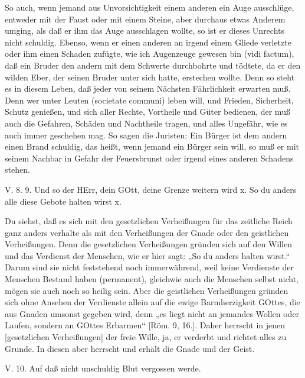 So auch, wenn jemand aus Unvorsichtigkeit einem anderen ein Auge ausschlüge, entweder mit der Faust oder mit einem Steine, aber durchaus etwas Anderem umging, als daß er ihm das Auge ausschlagen wollte, so ist er dieses Unrechts nicht schuldig. Ebenso, wenn er einen anderen an irgend einem Gliede verletzte oder ihm einen Schaden zufügte, wie ich Augenzeuge gewesen bin (vidi factum), daß ein Bruder den andern mit dem Schwerte durchbohrte und tödtete, da er den wilden Eber, der seinen Bruder unter sich hatte, erstechen wollte. Denn so steht es in diesem Leben, daß jeder von seinem Nächsten Fährlichkeit erwarten muß. Denn wer unter Leuten (societate communi) leben will, und Frieden, Sicherheit, Schutz genießen, und sich aller Rechte, Vortheile und Güter bedienen, der muß auch die Gefahren, Schäden und Nachtheile tragen, und alles Ungefähr, wie es auch immer geschehen mag. So sagen die Juristen: Ein Bürger ist dem andern einen Brand schuldig, das heißt, wenn jemand ein Bürger sein will, so muß er mit seinem Nachbar in Gefahr der Feuersbrunst oder irgend eines anderen Schadens stehen.

\begin{schriftzitat}
V. 8. 9. Und so der HErr, dein GOtt, deine Grenze weitern wird x. So du anders alle diese Gebote halten wirst x.
\end{schriftzitat}

Du siehst, daß es sich mit den gesetzlichen Verheißungen für das zeitliche Reich ganz anders verhalte als mit den Verheißungen der Gnade oder den geistlichen Verheißungen. Denn die gesetzlichen Verheißungen gründen sich auf den Willen und das Verdienst der Menschen, wie er hier sagt: „So du anders halten wirst.“ Darum sind sie nicht feststehend noch immerwährend, weil keine Verdienste der Menschen Bestand haben (permanent), gleichwie auch die Menschen selbst nicht, mögen sie auch noch so heilig sein. Aber die geistlichen Verheißungen gründen sich ohne Ansehen der Verdienste allein auf die ewige Barmherzigkeit GOttes, die aus Gnaden umsonst gegeben wird, denn „es liegt nicht an jemandes Wollen oder Laufen, sondern an GOttes Erbarmen“ [Röm. 9, 16.]. Daher herrscht in jenen [gesetzlichen Verheißungen] der freie Wille, ja, er verderbt und richtet alles zu Grunde. In diesen aber herrscht und erhält die Gnade und der Geist.

\begin{schriftzitat}
V. 10. Auf daß nicht unschuldig Blut vergossen werde.
\end{schriftzitat}

